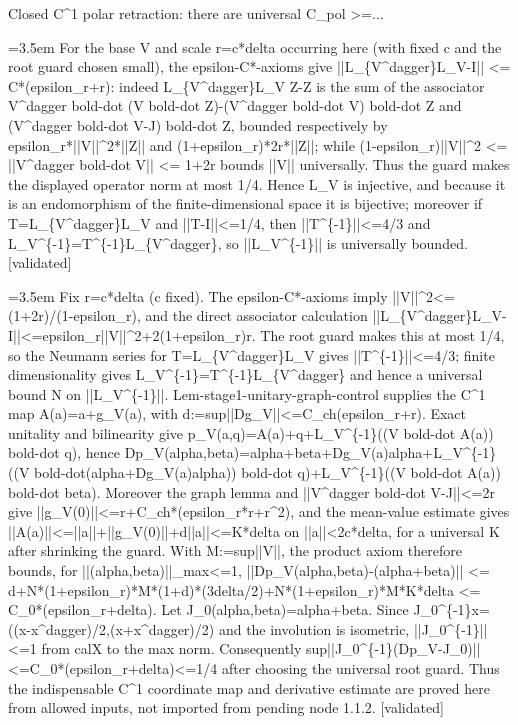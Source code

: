 \documentclass{article}
\newcommand{\step}[1]{\par\noindent\hangindent=3.5em\hangafter=1%
  \makebox[3.5em][l]{\textbf{#1.}}}
\newcommand{\steptag}[1]{\hfill{\small\textsf{[#1]}}}
\begin{document}
\begin{proofbox}{Closed C\textasciicircum{}1 polar retraction: there are universal C\_pol >=...}
\step{1.2.1.1} For the base V and scale r=c*delta occurring here (with fixed c and the root guard chosen small), the epsilon-C*-axioms give ||L\_\{V\textasciicircum{}dagger\}L\_V-I|| <= C*(epsilon\_r+r): indeed L\_\{V\textasciicircum{}dagger\}L\_V Z-Z is the sum of the associator V\textasciicircum{}dagger bold-dot (V bold-dot Z)-(V\textasciicircum{}dagger bold-dot V) bold-dot Z and (V\textasciicircum{}dagger bold-dot V-J) bold-dot Z, bounded respectively by epsilon\_r*||V||\textasciicircum{}2*||Z|| and (1+epsilon\_r)*2r*||Z||; while (1-epsilon\_r)||V||\textasciicircum{}2 <= ||V\textasciicircum{}dagger bold-dot V|| <= 1+2r bounds ||V|| universally. Thus the guard makes the displayed operator norm at most 1/4. Hence L\_V is injective, and because it is an endomorphism of the finite-dimensional space it is bijective; moreover if T=L\_\{V\textasciicircum{}dagger\}L\_V and ||T-I||<=1/4, then ||T\textasciicircum{}\{-1\}||<=4/3 and L\_V\textasciicircum{}\{-1\}=T\textasciicircum{}\{-1\}L\_\{V\textasciicircum{}dagger\}, so ||L\_V\textasciicircum{}\{-1\}|| is universally bounded. \steptag{validated} \\[4pt]
\step{1.2.1.2} Fix r=c*delta (c fixed). The epsilon-C*-axioms imply ||V||\textasciicircum{}2<=(1+2r)/(1-epsilon\_r), and the direct associator calculation ||L\_\{V\textasciicircum{}dagger\}L\_V-I||<=epsilon\_r||V||\textasciicircum{}2+2(1+epsilon\_r)r. The root guard makes this at most 1/4, so the Neumann series for T=L\_\{V\textasciicircum{}dagger\}L\_V gives ||T\textasciicircum{}\{-1\}||<=4/3; finite dimensionality gives L\_V\textasciicircum{}\{-1\}=T\textasciicircum{}\{-1\}L\_\{V\textasciicircum{}dagger\} and hence a universal bound N on ||L\_V\textasciicircum{}\{-1\}||. Lem-stage1-unitary-graph-control supplies the C\textasciicircum{}1 map A(a)=a+g\_V(a), with d:=sup||Dg\_V||<=C\_ch(epsilon\_r+r). Exact unitality and bilinearity give p\_V(a,q)=A(a)+q+L\_V\textasciicircum{}\{-1\}((V bold-dot A(a)) bold-dot q), hence Dp\_V(alpha,beta)=alpha+beta+Dg\_V(a)alpha+L\_V\textasciicircum{}\{-1\}((V bold-dot(alpha+Dg\_V(a)alpha)) bold-dot q)+L\_V\textasciicircum{}\{-1\}((V bold-dot A(a)) bold-dot beta). Moreover the graph lemma and ||V\textasciicircum{}dagger bold-dot V-J||<=2r give ||g\_V(0)||<=r+C\_ch*(epsilon\_r*r+r\textasciicircum{}2), and the mean-value estimate gives ||A(a)||<=||a||+||g\_V(0)||+d||a||<=K*delta on ||a||<2c*delta, for a universal K after shrinking the guard. With M:=sup||V||, the product axiom therefore bounds, for ||(alpha,beta)||\_max<=1, ||Dp\_V(alpha,beta)-(alpha+beta)|| <= d+N*(1+epsilon\_r)*M*(1+d)*(3delta/2)+N*(1+epsilon\_r)*M*K*delta <= C\_0*(epsilon\_r+delta). Let J\_0(alpha,beta)=alpha+beta. Since J\_0\textasciicircum{}\{-1\}x=((x-x\textasciicircum{}dagger)/2,(x+x\textasciicircum{}dagger)/2) and the involution is isometric, ||J\_0\textasciicircum{}\{-1\}||<=1 from calX to the max norm. Consequently sup||J\_0\textasciicircum{}\{-1\}(Dp\_V-J\_0)||<=C\_0*(epsilon\_r+delta)<=1/4 after choosing the universal root guard. Thus the indispensable C\textasciicircum{}1 coordinate map and derivative estimate are proved here from allowed inputs, not imported from pending node 1.1.2. \steptag{validated} \\[4pt]

\end{proofbox}
\end{document}
